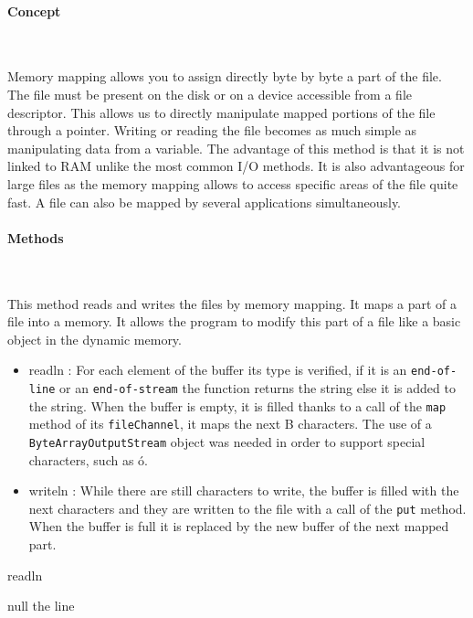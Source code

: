 \documentclass[12pt]{article}
\begin{document}
\paragraph{Concept}\mbox{}\\ \par

Memory mapping allows you to assign directly byte by byte a part of the file. The file must be present on the disk or on a device accessible from a file descriptor. This allows us to directly manipulate mapped portions of the file through a pointer.  Writing or reading the file becomes as much simple as manipulating data from a variable. The advantage of this method is that it is not linked to RAM unlike the most common I/O methods. It is also advantageous for large files as the memory mapping allows to access specific areas of the file quite fast. A file can also be mapped by several applications simultaneously. 

\paragraph{Methods}\mbox{}\\ \par
This method reads and writes the files by memory mapping. It maps a part of a file into a memory. It allows the program to modify this part of a file like a basic object in the dynamic memory.

\begin{itemize}
    \item readln : For each element of the buffer its type is verified, if it is an \texttt{end-of-line} or an \texttt{end-of-stream} the function returns the string else it is added to the string. When the buffer is empty, it is filled thanks to a call of the \texttt{map} method of its \texttt{fileChannel}, it maps the next B characters. The use of a \texttt{ByteArrayOutputStream} object was needed in order to support special characters, such as ó.
    
    \item writeln : While there are still characters to write, the buffer is filled with the next characters and they are written to the file with a call of the \texttt{put} method. When the buffer is full it is replaced by the new buffer of the next mapped part.
\end{itemize}

\begin{algorithm}[H]
\caption{readln}
\label{algo:7}
\begin{algorithmic}[1]
\RETURN null
\ELSE
{}
\ENDIF
{}
\ENDWHILE
\RETURN the line
\ENDIF
\end{algorithmic}
\end{algorithm}
\end{document}
